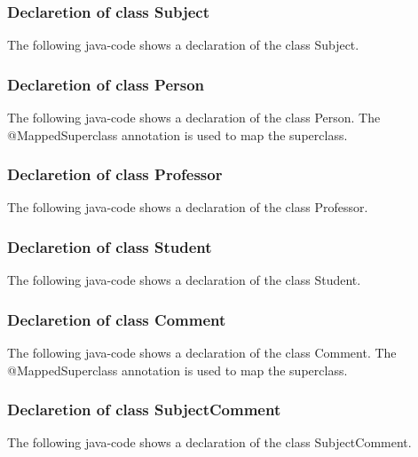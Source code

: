 \documentclass[a4paper, oneside]{article}
\begin{document}
\subsubsection{Declaretion of class Subject}
The following java-code shows a declaration of the class Subject.
\vspace{2mm}

\vspace{5mm}


\subsubsection{Declaretion of class Person}
The following java-code shows a declaration of the class Person. The @MappedSuperclass annotation is used to map the superclass.
\vspace{2mm}

\vspace{5mm}


\subsubsection{Declaretion of class Professor}
The following java-code shows a declaration of the class Professor.
\vspace{2mm}

\vspace{5mm}


\subsubsection{Declaretion of class Student}
The following java-code shows a declaration of the class Student.
\vspace{2mm}

\vspace{5mm}


\subsubsection{Declaretion of class Comment}
The following java-code shows a declaration of the class Comment. The @MappedSuperclass annotation is used to map the superclass.
\vspace{2mm}

\vspace{5mm}


\subsubsection{Declaretion of class SubjectComment}
The following java-code shows a declaration of the class SubjectComment.
\vspace{2mm}

\vspace{5mm}
\end{document}
